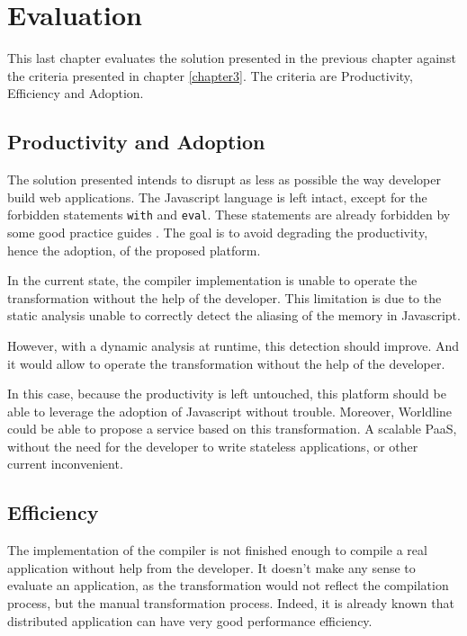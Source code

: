 \chapter{Evaluation} \label{chapter6}
\minitoc
\eject

This last chapter evaluates the solution presented in the previous chapter against the criteria presented in chapter \ref{chapter3}.
The criteria are Productivity, Efficiency and Adoption.

\section{Productivity and Adoption}

The solution presented intends to disrupt as less as possible the way developer build web applications.
The Javascript language is left intact, except for the forbidden statements \texttt{with} and \texttt{eval}.
These statements are already forbidden by some good practice guides \cite{Crockford2008}.
The goal is to avoid degrading the productivity, hence the adoption, of the proposed platform.

In the current state, the compiler implementation is unable to operate the transformation without the help of the developer.
This limitation is due to the static analysis unable to correctly detect the aliasing of the memory in Javascript.

However, with a dynamic analysis at runtime, this detection should improve.
And it would allow to operate the transformation without the help of the developer.

In this case, because the productivity is left untouched, this platform should be able to leverage the adoption of Javascript without trouble.
Moreover, Worldline could be able to propose a service based on this transformation.
A scalable PaaS, without the need for the developer to write stateless applications, or other current inconvenient.


\section{Efficiency}

The implementation of the compiler is not finished enough to compile a real application without help from the developer.
It doesn't make any sense to evaluate an application, as the transformation would not reflect the compilation process, but the manual transformation process.
Indeed, it is already known that distributed application can have very good performance efficiency.

